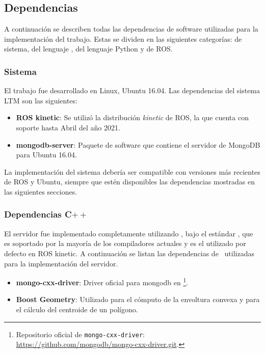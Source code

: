 \subsection{Dependencias}

A continuación se describen todas las dependencias de software utilizadas para la implementación del trabajo. Estas se dividen en las siguientes categorías: de sistema, del lenguaje \CC, del lenguaje Python y de ROS.


\subsubsection{Sistema}

El trabajo fue desarrollado en Linux, Ubuntu 16.04. Las dependencias del sistema LTM son las siguientes:

\begin{itemize}
\item {\bfseries ROS kinetic}: Se utilizó la distribución \textit{kinetic} de ROS, la que cuenta con soporte hasta Abril del año 2021.
\item {\bfseries mongodb-server}: Paquete de software que contiene el servidor de MongoDB para Ubuntu 16.04.
\end{itemize}

La implementación del sistema debería ser compatible con versiones más recientes de ROS y Ubuntu, siempre que estén disponibles las dependencias mostradas en las siguientes secciones.


\subsubsection{Dependencias C$++$}

El servidor fue implementado completamente utilizando \CC, bajo el estándar , que es soportado por la mayoría de los compiladores actuales y es el utilizado por defecto en ROS kinetic. A continuación se listan las dependencias de \CC \ utilizadas para la implementación del servidor.

\begin{itemize}
	\item {\bfseries mongo-cxx-driver}: Driver oficial para mongodb en \CC\footnote{Repositorio oficial de \texttt{mongo-cxx-driver}: \url{https://github.com/mongodb/mongo-cxx-driver.git}.}. 
	\item {\bfseries Boost Geometry}: Utilizado para el cómputo de la envoltura convexa y para el cálculo del centroide de un polígono.
\end{itemize}


